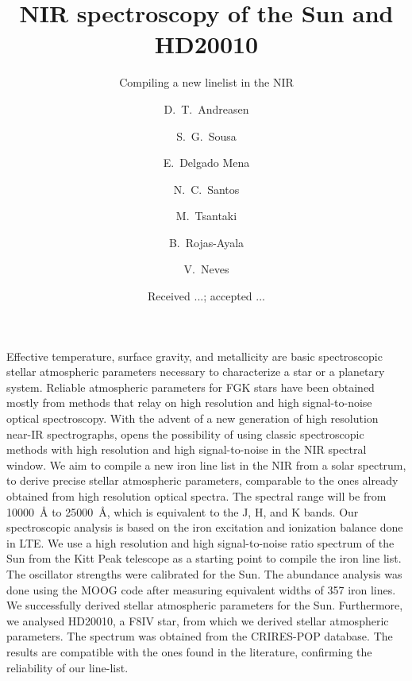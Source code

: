 \documentclass{aa}
\begin{document}
\title{NIR spectroscopy of the Sun and HD20010}
\subtitle{Compiling a new linelist in the NIR}


\author{ D.~T.~Andreasen
    \and S.~G.~Sousa
    \and E.~Delgado Mena
    \and N.~C.~Santos
    \and M.~Tsantaki
    \and B.~Rojas-Ayala
    \and V.~Neves}







\date{Received ...; accepted ...}

\abstract
{Effective temperature, surface gravity, and metallicity are basic
spectroscopic stellar atmospheric parameters necessary to characterize
a star or a planetary system. Reliable atmospheric parameters for
FGK stars have been obtained mostly from methods that relay on high
resolution and high signal-to-noise optical spectroscopy. With the
advent of a new generation of high resolution near-IR spectrographs,
opens the possibility of using classic spectroscopic methods with
high resolution and high signal-to-noise in the NIR spectral window.}
{We aim to compile a new iron line list in the NIR from a solar
spectrum, to derive precise stellar atmospheric parameters,
comparable to the ones already obtained from high resolution optical
spectra. The spectral range will be from \SI{10000}{\angstrom} to
\SI{25000}{\angstrom}, which is equivalent to the J, H, and K bands.}
{Our spectroscopic analysis is based on the iron excitation and
ionization balance done in LTE. We
use a high resolution and high signal-to-noise ratio spectrum of the Sun
from the Kitt Peak telescope as a starting point to compile the iron
line list. The oscillator strengths were calibrated for the Sun.
The abundance analysis was done using
the MOOG code after measuring equivalent widths of 357 iron lines. }
{We successfully derived stellar atmospheric parameters for the
Sun.
Furthermore, we analysed
HD20010, a F8IV star, from which we derived stellar atmospheric
parameters. The spectrum was obtained from the CRIRES-POP database.
The results are compatible with the ones found in the literature,
confirming the reliability of our line-list.}
{}
\end{document}
